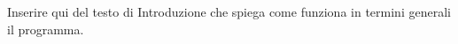 \documentclass[../Relazione.tex]{subfiles}
\begin{document}
Inserire qui del testo di Introduzione
che spiega come funziona in termini generali
il programma.
\end{document}

